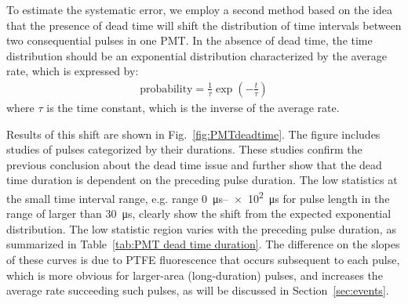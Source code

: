 To estimate the systematic error, we employ a second method based on the idea that the presence of dead time will shift the distribution of time intervals between two consequential pulses in one PMT. In the absence of dead time, the time distribution should be an exponential distribution characterized by the average rate, which is expressed by: %
\begin{align}
	\text{probability} = \frac{1}{\tau}\exp \left( - \frac{t}{\tau} \right)
\end{align}
where $\tau$ is the time constant, which is the inverse of the average rate. 

Results of this shift are shown in Fig.~\ref{fig:PMTdeadtime}. %
The figure includes studies of pulses categorized by their durations. These studies confirm the previous conclusion about the dead time issue and further show that the dead time duration is dependent on the preceding pulse duration. The low statistics at the small time interval range, e.g. range \SIrange{0}{e2}{\us} for pulse length in the range of larger than \SI{30}{\us}, clearly show the shift from the expected exponential distribution. The low statistic region varies with the preceding pulse duration, as summarized in Table~\ref{tab:PMT dead time duration}. The difference on the slopes of these curves is due to PTFE fluorescence that occurs subsequent to each pulse, which is more obvious for larger-area (long-duration) pulses, and increases the average rate succeeding such pulses, as will be discussed in Section~\ref{sec:events}. 

